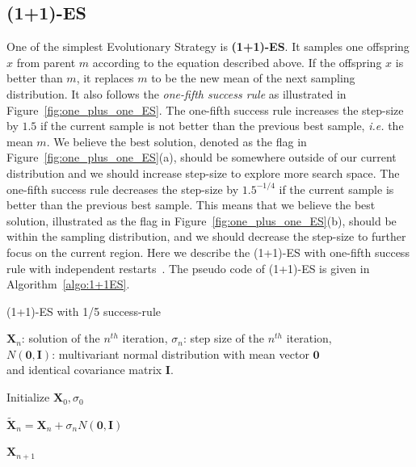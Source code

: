 \subsection{(1+1)-ES}
One of the simplest Evolutionary Strategy is \textbf{(1+1)-ES}.
It samples one offspring $x$ from parent $m$ according to the equation described above.
If the offspring $x$ is better than $m$, it replaces $m$ to be the new mean of the next sampling distribution.
It also follows the \textit{one-fifth success rule} as illustrated in Figure~\ref{fig:one_plus_one_ES}.
The one-fifth success rule increases the step-size by $1.5$ if the current sample is not better than the previous best sample, \textit{i.e.} the mean $m$.
We believe the best solution, denoted as the flag in Figure~\ref{fig:one_plus_one_ES}(a), 
should be somewhere outside of our current distribution and we should increase step-size to explore more search space.
The one-fifth success rule decreases the step-size by $1.5^{-1/4}$ if the current sample is better than the previous best sample.
This means that we believe the best solution, illustrated as the flag in Figure~\ref{fig:one_plus_one_ES}(b),
should be within the sampling distribution, and we should decrease the step-size to further focus on the current region.
Here we describe the (1+1)-ES with one-fifth success rule with independent restarts~\cite{Auger:2009:one_plus_one_ES}.
The pseudo code of (1+1)-ES is given in Algorithm~\ref{algo:1+1ES}.

\begin{algorithm}%
\caption{(1+1)-ES with 1/5 success-rule}\label{algo:1+1ES}

$\boldsymbol{X}_{n}$: solution of the $n^{th}$ iteration, $\sigma_n$: step size of the $n^{th}$ iteration, \\
$N(\boldsymbol{0}, \boldsymbol{I})$: multivariant normal distribution with mean vector $\boldsymbol{0}$ \\ 
and identical covariance matrix $\boldsymbol{I}$.

\BlankLine
{} 

\BlankLine
Initialize $\boldsymbol{X}_0, \sigma_0$ \\
 {

    $\widetilde{\boldsymbol{X}}_n = \boldsymbol{X}_n + \sigma_n N(\boldsymbol{0}, \boldsymbol{I})$  \\

}

\Return $\boldsymbol{X}_{n+1}$

\end{algorithm}



